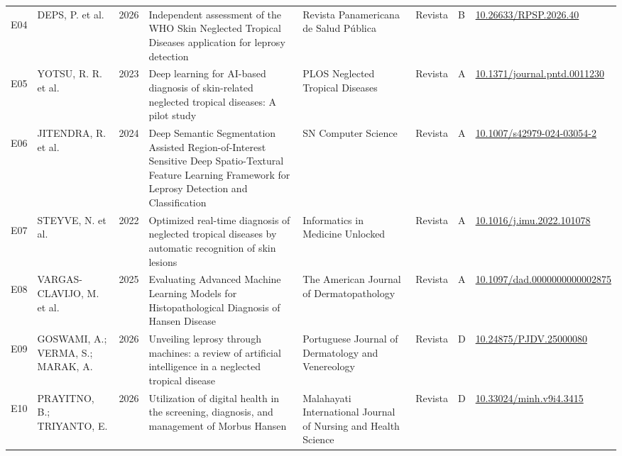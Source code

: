\begin{longtable}{@{}lp{2.7cm}lp{3.6cm}p{2.7cm}llp{2.1cm}@{}}
\hypertarget{estudo:E04}{}E04 & DEPS, P. et al. & 2026 & Independent assessment of the WHO Skin Neglected Tropical Diseases application for leprosy detection & Revista Panamericana de Salud Pública & Revista & B & \href{https://doi.org/10.26633/RPSP.2026.40}{10.\allowbreak{}26633/\allowbreak{}RPSP.\allowbreak{}2026.\allowbreak{}40} \\
\hypertarget{estudo:E05}{}E05 & YOTSU, R. R. et al. & 2023 & Deep learning for AI-based diagnosis of skin-related neglected tropical diseases: A pilot study & PLOS Neglected Tropical Diseases & Revista & A & \href{https://doi.org/10.1371/journal.pntd.0011230}{10.\allowbreak{}1371/\allowbreak{}journal.\allowbreak{}pntd.\allowbreak{}0011230} \\
\hypertarget{estudo:E06}{}E06 & JITENDRA, R. et al. & 2024 & Deep Semantic Segmentation Assisted Region-of-Interest Sensitive Deep Spatio-Textural Feature Learning Framework for Leprosy Detection and Classification & SN Computer Science & Revista & A & \href{https://doi.org/10.1007/s42979-024-03054-2}{10.\allowbreak{}1007/\allowbreak{}s42979-024-03054-2} \\
\hypertarget{estudo:E07}{}E07 & STEYVE, N. et al. & 2022 & Optimized real-time diagnosis of neglected tropical diseases by automatic recognition of skin lesions & Informatics in Medicine Unlocked & Revista & A & \href{https://doi.org/10.1016/j.imu.2022.101078}{10.\allowbreak{}1016/\allowbreak{}j.\allowbreak{}imu.\allowbreak{}2022.\allowbreak{}101078} \\
\hypertarget{estudo:E08}{}E08 & VARGAS-CLAVIJO, M. et al. & 2025 & Evaluating Advanced Machine Learning Models for Histopathological Diagnosis of Hansen Disease & The American Journal of Dermatopathology & Revista & A & \href{https://doi.org/10.1097/dad.0000000000002875}{10.\allowbreak{}1097/\allowbreak{}dad.\allowbreak{}0000000000002875} \\
\hypertarget{estudo:E09}{}E09 & GOSWAMI, A.; VERMA, S.; MARAK, A. & 2026 & Unveiling leprosy through machines: a review of artificial intelligence in a neglected tropical disease & Portuguese Journal of Dermatology and Venereology & Revista & D & \href{https://doi.org/10.24875/PJDV.25000080}{10.\allowbreak{}24875/\allowbreak{}PJDV.\allowbreak{}25000080} \\
\hypertarget{estudo:E10}{}E10 & PRAYITNO, B.; TRIYANTO, E. & 2026 & Utilization of digital health in the screening, diagnosis, and management of Morbus Hansen & Malahayati International Journal of Nursing and Health Science & Revista & D & \href{https://doi.org/10.33024/minh.v9i4.3415}{10.\allowbreak{}33024/\allowbreak{}minh.\allowbreak{}v9i4.\allowbreak{}3415} \\

\end{longtable}
